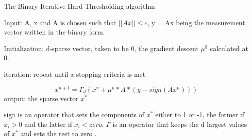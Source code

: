 \begin{algorithm}
	\caption{The Binary Iterative Hard Thresholding algorithm}
Input: A, x and A is chosen such that $ ||Ax|| \leq c $, y = Ax being the measurement vector written in the binary form. 

Initialization: d-sparse vector, taken to be $ 0 $, the gradient descent $ \mu^0 $ calculated at $ 0 $. 

iteration: repeat until a stopping criteria is met

\begin{equation}\label{key}
x^{n+1} = \Gamma_d(x^n+ \mu^{n} * A* (y - sign(Ax^n)))
\end{equation}  
output: the sparse vector $ x^{*} $
\end{algorithm}
sign is an operator that sets the components of $ x^{*} $ either to 1 or -1, the former if $ x_i > 0$ and the latter if $ x_i < zero $. $ \Gamma $ is an operator that keeps the d largest values of $ x^{*} $ and sets the rest to zero \cite{biht}. 
   
 
  
